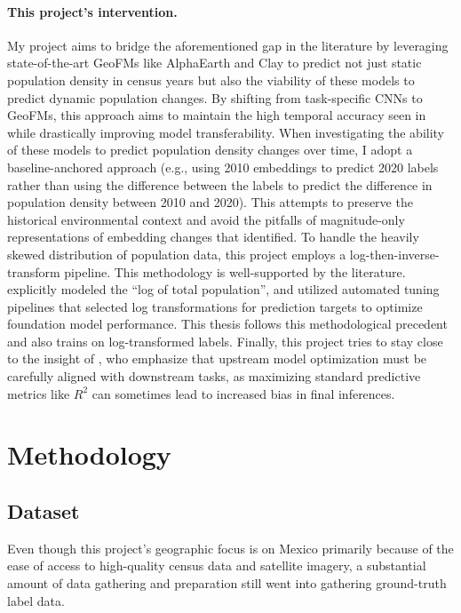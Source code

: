 \documentclass[12pt,letterpaper]{article}
\begin{document}
\paragraph{This project's intervention.}
My project aims to bridge the aforementioned gap in the literature by leveraging state-of-the-art GeoFMs like AlphaEarth and Clay to predict not just static population density in census years but also the viability of these models to predict dynamic population changes. By shifting from task-specific CNNs to GeoFMs, this approach aims to maintain the high temporal accuracy seen in \textcite{khachiyan2021using} while drastically improving model transferability. When investigating the ability of these models to predict population density changes over time, I adopt a baseline-anchored approach (e.g., using 2010 embeddings to predict 2020 labels rather than using the difference between the labels to predict the difference in population density between 2010 and 2020). This attempts to preserve the historical environmental context and avoid the pitfalls of magnitude-only representations of embedding changes that \textcite{Burns2026} identified. To handle the heavily skewed distribution of population data, this project employs a log-then-inverse-transform pipeline. This methodology is well-supported by the literature. \textcite{khachiyan2021using} explicitly modeled the ``log of total population'', and \textcite{proctor2025what} utilized automated tuning pipelines that selected log transformations for prediction targets to optimize foundation model performance. This thesis follows this methodological precedent and also trains on log-transformed labels. Finally, this project tries to stay close to the insight of \textcite{ratledge2022using}, who emphasize that upstream model optimization must be carefully aligned with downstream tasks, as maximizing standard predictive metrics like $R^2$ can sometimes lead to increased bias in final inferences. 

\newpage

\section{Methodology}
\label{sec:methodology}

\subsection{Dataset}
Even though this project's geographic focus is on Mexico primarily because of the ease of access to high-quality census data and satellite imagery, a substantial amount of data gathering and preparation still went into gathering ground-truth label data.
\end{document}
